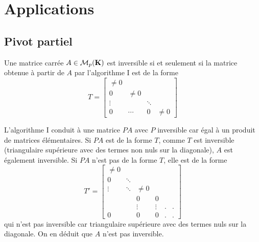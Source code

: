 \section{Applications}
\subsection{Pivot partiel}
\begin{prop}
 Une matrice carrée $A\in \mathcal{M}_p(\mathbf{K})$ est inversible si et seulement si la matrice obtenue à partir de $A$ par l'algorithme I est de la forme
\begin{displaymath} T =
  \begin{bmatrix}
\neq 0 &        &        &        \\
0      & \neq 0  &        &        \\
\vdots &         & \ddots &        \\
0      &\cdots  &     0   &\neq 0 
 \end{bmatrix}
\end{displaymath}
\end{prop}
\begin{demo}
 L'algorithme I conduit à une matrice $PA$ avec $P$ inversible car égal à un produit de matrices élémentaires. Si $PA$ est de la forme $T$, comme $T$ est inversible (triangulaire supérieure avec des termes non nuls sur la diagonale), $A$ est également inversible.\newline
Si $PA$ n'est pas de la forme $T$, elle est de la forme
\[
T'=
 \begin{bmatrix}
 \neq 0 &  &  &  &  &  \\
 0 & \ddots &  &  &  &  \\
 \vdots &\ddots  &\neq 0  &  &  &  \\
        &        &0  &0  &  &  \\
        &        &\vdots & \vdots & . & . \\
 0      &        &   0   &   0    & . &. 
\end{bmatrix} 
\]
qui n'est pas inversible car triangulaire supérieure avec des termes nuls sur la diagonale. On en déduit que $A$ n'est pas inversible.
\end{demo}

